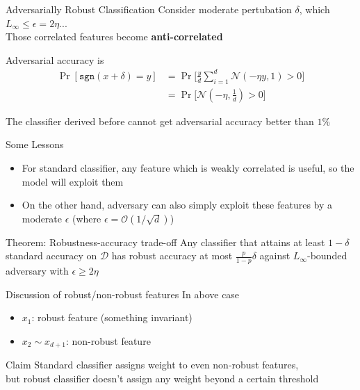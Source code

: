 \documentclass{beamer}
\begin{document}
\begin{frame}{Adversarially Robust Classification}
  Consider moderate pertubation $\delta$, which $L_\infty \leq \epsilon = 2 \eta$...\\
  Those correlated features become \textbf{anti-correlated}

  Adversarial accuracy is
    \begin{align*}
      \Pr[\texttt{sgn}(x + \delta) = y] &= \Pr \Big[\frac{y}{d}\sum_{i=1}^d \mathcal{N}(-\eta y,1) > 0 \Big] \\
                                &= \Pr \Big[\mathcal{N}(-\eta,\frac{1}{d}) > 0 \Big]
    \end{align*}

  The classifier derived before cannot get adversarial accuracy better than $1\%$
\end{frame}

\begin{frame}{Some Lessons}
  \begin{itemize}
    \item For standard classifier, any feature which is weakly correlated is useful, so the model will exploit them
    \item On the other hand, adversary can also simply exploit these features by a moderate $\epsilon$ (where $\epsilon = \mathcal{O}(1/\sqrt{d})$)
  \end{itemize}
\end{frame}

\begin{frame}{Theorem: Robustness-accuracy trade-off}
  Any classifier that attains at least $1 - \delta$ standard accuracy on $\mathcal{D}$ has robust accuracy at most $\frac{p}{1-p}\delta$ against $L_\infty$-bounded adversary with $\epsilon \geq 2 \eta$
\end{frame}

\begin{frame}{Discussion of robust/non-robust features}
  In above case
  \begin{itemize}
    \item $x_1$: robust feature (something invariant)
    \item $x_2 \sim x_{d+1}$: non-robust feature
  \end{itemize}
  \begin{block}{Claim}
    Standard classifier assigns weight to even non-robust features, \\but robust classifier doesn't assign any weight beyond a certain threshold
  \end{block}
\end{frame}
\end{document}
